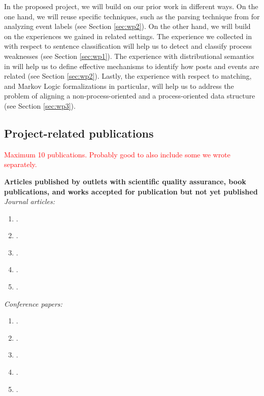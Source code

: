 \documentclass{scrartcl}
\newcommand\todo[1]{\textcolor{red}{#1}}
\begin{document}
In the proposed project, we will build on our prior work in different ways. On the one hand, we will reuse specific techniques, such as the parsing technique from \cite{leopold2019using} for analyzing event labels (see Section \ref{sec:wp2}). On the other hand, we will build on the experiences we gained in related settings. The experience we collected in \cite{van2017transforming} with respect to sentence classification will help us to detect and classify process weaknesses (see Section \ref{sec:wp1}). The experience with distributional semantics in \cite{leopold2015towards} will help us to define effective mechanisms to identify how posts and events are related (see Section \ref{sec:wp2}). Lastly, the experience with respect to matching, and Markov Logic formalizations in particular, will help us to address the problem of aligning a non-process-oriented and a process-oriented data structure (see Section \ref{sec:wp3}).  

\subsection{Project-related publications}

\todo{Maximum 10 publications. Probably good to also include some we wrote separately.}

\noindent \textbf{Articles published by outlets with scientific quality assurance, book publications, and works accepted for publication but not yet published}\\[6pt]
\textit{Journal articles:}
\begin{enumerate}[leftmargin=*]
\item {}.
\item {}.
\item {}.
\item {}.
\item {}.
\end{enumerate}
\textit{Conference papers:}
\begin{enumerate}[resume,leftmargin=*]
\item {}.
\item {}.
\item {}.
\item {}.
\item {}.
\end{enumerate}
\end{document}

